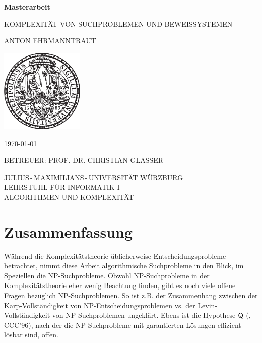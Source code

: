 \pagestyle{empty}

\begin{center}{

\vfill\sffamily

{\Large\textbf{Masterarbeit}}\par
    \vspace*{1cm}
{\huge{KOMPLEXITÄT VON SUCHPROBLEMEN UND BEWEISSYSTEMEN}}\par
    \vspace*{.3cm}
{\Large{ANTON EHRMANNTRAUT}}\par}
\vspace*{6cm}

\includegraphics[width=4cm]{siegel.pdf}

\vspace*{4cm}


\bgroup\sffamily{}
{\large\MakeUppercase{\today}}\vspace*{.7cm}

{\large BETREUER: PROF. DR. CHRISTIAN GLASSER}\vspace*{.5cm}


{\large
JULIUS\,-\,MAXIMILIANS\,-\,UNIVERSITÄT WÜRZBURG\\
LEHRSTUHL FÜR INFORMATIK I\\
ALGORITHMEN UND KOMPLEXITÄT
}
\egroup


\end{center}

\cleardoublepage
\restoregeometry

\section*{Zusammenfassung}
Während die Komplexitätstheorie üblicherweise Entscheidungsprobleme betrachtet, nimmt diese Arbeit algorithmische Suchprobleme in den Blick, im Speziellen die NP-Suchprobleme. 
Obwohl NP-Suchprobleme in der Komplexitätstheorie eher wenig Beachtung finden, gibt es noch viele offene Fragen bezüglich NP-Suchproblemen. So ist z.B. der Zusammenhang zwischen der Karp-Vollständigkeit von NP-Entscheidungsproblemen vs. der Levin-Vollständigkeit von NP-Suchproblemen ungeklärt. Ebens ist die Hypothese $\mathsf{Q}$ (\citeauthor{fenner_inverting_1996}, CCC’96), nach der die NP-Suchprobleme mit garantierten Lösungen effizient lösbar sind, offen.

